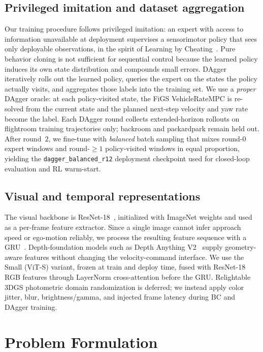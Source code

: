 \documentclass[10pt,twocolumn,letterpaper]{article}
\begin{document}
\subsection{Privileged imitation and dataset aggregation}

Our training procedure follows privileged imitation: an expert with access to information unavailable at deployment supervises a sensorimotor policy that sees only deployable observations, in the spirit of Learning by Cheating~\cite{chen2020learning}. Pure behavior cloning is not sufficient for sequential control because the learned policy induces its own state distribution and compounds small errors. DAgger~\cite{ross2011reduction} iteratively rolls out the learned policy, queries the expert on the states the policy actually visits, and aggregates those labels into the training set. We use a \emph{proper} DAgger oracle: at each policy-visited state, the FiGS VehicleRateMPC is re-solved from the current state and the planned next-step velocity and yaw rate become the label. Each DAgger round collects extended-horizon rollouts on flightroom training trajectories only; backroom and packardpark remain held out. After round~$2$, we fine-tune with \emph{balanced} batch sampling that mixes round-$0$ expert windows and round-${\geq}1$ policy-visited windows in equal proportion, yielding the \texttt{dagger\_balanced\_r12} deployment checkpoint used for closed-loop evaluation and RL warm-start.

\subsection{Visual and temporal representations}

The visual backbone is ResNet-18~\cite{he2016deep}, initialized with ImageNet weights and used as a per-frame feature extractor. Since a single image cannot infer approach speed or ego-motion reliably, we process the resulting feature sequence with a GRU~\cite{cho2014learning}. Depth-foundation models such as Depth Anything V2~\cite{yang2024depthanythingv2} supply geometry-aware features without changing the velocity-command interface. We use the Small (ViT-S) variant, frozen at train and deploy time, fused with ResNet-18 RGB features through LayerNorm cross-attention before the GRU. Relightable 3DGS photometric domain randomization is deferred; we instead apply color jitter, blur, brightness/gamma, and injected frame latency during BC and DAgger training.

\section{Problem Formulation}
\label{sec:formulation}
\end{document}
